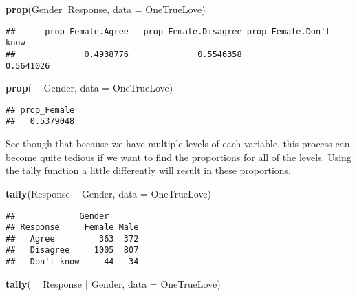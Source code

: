 \documentclass[]{book}
\newenvironment{Shaded}{\begin{snugshade}}{\end{snugshade}}
\newcommand{\DataTypeTok}[1]{\textcolor[rgb]{0.13,0.29,0.53}{#1}}
\newcommand{\KeywordTok}[1]{\textcolor[rgb]{0.13,0.29,0.53}{\textbf{#1}}}
\newcommand{\NormalTok}[1]{#1}
\newcommand{\OperatorTok}[1]{\textcolor[rgb]{0.81,0.36,0.00}{\textbf{#1}}}
\newcommand{\StringTok}[1]{\textcolor[rgb]{0.31,0.60,0.02}{#1}}
\begin{document}
\begin{Shaded}
\begin{Highlighting}[]
\KeywordTok{prop}\NormalTok{(Gender}\OperatorTok{~}\NormalTok{Response, }\DataTypeTok{data =}\NormalTok{ OneTrueLove)}
\end{Highlighting}
\end{Shaded}

\begin{verbatim}
##      prop_Female.Agree   prop_Female.Disagree prop_Female.Don't know 
##              0.4938776              0.5546358              0.5641026
\end{verbatim}

\begin{Shaded}
\begin{Highlighting}[]
\KeywordTok{prop}\NormalTok{( }\OperatorTok{~}\StringTok{ }\NormalTok{Gender, }\DataTypeTok{data =}\NormalTok{ OneTrueLove)}
\end{Highlighting}
\end{Shaded}

\begin{verbatim}
## prop_Female 
##   0.5379048
\end{verbatim}

See though that because we have multiple levels of each variable, this process can become quite tedious if we want to find the proportions for all of the levels. Using the tally function a little differently will result in these proportions.

\begin{Shaded}
\begin{Highlighting}[]
\KeywordTok{tally}\NormalTok{(Response }\OperatorTok{~}\StringTok{ }\NormalTok{Gender, }\DataTypeTok{data =}\NormalTok{ OneTrueLove)}
\end{Highlighting}
\end{Shaded}

\begin{verbatim}
##             Gender
## Response     Female Male
##   Agree         363  372
##   Disagree     1005  807
##   Don't know     44   34
\end{verbatim}

\begin{Shaded}
\begin{Highlighting}[]
\KeywordTok{tally}\NormalTok{( }\OperatorTok{~}\StringTok{ }\NormalTok{Response }\OperatorTok{|}\StringTok{ }\NormalTok{Gender, }\DataTypeTok{data =}\NormalTok{ OneTrueLove)}
\end{Highlighting}
\end{Shaded}
\end{document}

